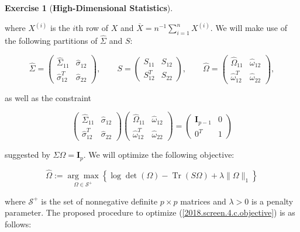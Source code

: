 \documentclass{article}
\theoremstyle{definition}
\newtheorem{exercise}{Exercise}
\theoremstyle{definition}
\theoremstyle{definition}
\theoremstyle{definition}
\DeclareMathOperator{\Tr}{Tr}
\begin{document}
\begin{exercise}[\textbf{High-Dimensional Statistics}]
\begin{enumerate}[(a)]
where \(X^{(i)}\) is the \(i\)th row of \(X\) and \(\overline{X} = n^{-1}\sum_{i=1}^n X^{(i)}\). We will make use of the following partitions of \(\hat{\Sigma}\) and \(S\):

\begin{equation}\label{2018.screen.4.c.partitions}
\hat{\Sigma} = \begin{pmatrix} 
\hat{\Sigma}_{11} & \hat{\sigma}_{12} \\
\hat{\sigma}_{12}^T & \hat{\sigma}_{22}
\end{pmatrix}, \qquad S = \begin{pmatrix} 
S_{11} & S_{12} \\
S_{12}^T & S_{22}
\end{pmatrix}, \qquad \hat{\Omega} = \begin{pmatrix} 
\hat{\Omega}_{11} & \hat{\omega}_{12} \\
\hat{\omega}_{12}^T & \hat{\omega}_{22}
\end{pmatrix},
\end{equation}

as well as the constraint

\begin{equation}\label{2018.screen.4.c.constraint}
 \begin{pmatrix} 
\hat{\Sigma}_{11} & \hat{\sigma}_{12} \\
\hat{\sigma}_{12}^T & \hat{\sigma}_{22}
\end{pmatrix}   \begin{pmatrix} 
\hat{\Omega}_{11} & \hat{\omega}_{12} \\
\hat{\omega}_{12}^T & \hat{\omega}_{22}
\end{pmatrix}=\begin{pmatrix}
\boldsymbol{I}_{p-1} & 0 \\
0^T & 1
\end{pmatrix}
\end{equation}

suggested by \(\Sigma \Omega = \boldsymbol{I}_p\). We will optimize the following objective:

\begin{equation}\label{2018.screen.4.c.objective}
\hat{\Omega} := \underset{\Omega \in \mathcal{S}^+}{\arg \max} \left\{ \log \det (\Omega) - \Tr(S \Omega) + \lambda \lVert \Omega \rVert_1 \right\}
\end{equation}

where \( \mathcal{S}^+\) is the set of nonnegative definite \(p \times p\) matrices and \(\lambda > 0\) is a penalty parameter. The proposed procedure to optimize (\ref{2018.screen.4.c.objective}) is as follows:


\end{enumerate}
\end{exercise}
\end{document}
